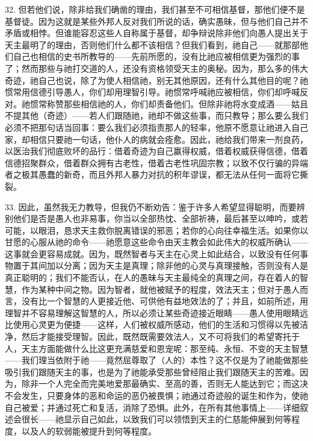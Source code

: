 32. 但若他们说，除非给我们确凿的理由，我们甚至不可相信基督，那他们便不是基督徒。因为这就是某些外邦人反对我们所说的话，确实愚昧，但与他们自己并不矛盾或相悖。但谁能容忍这些人自称属于基督，却争辩说除非他们向愚人提出关于天主最明了的理由，否则他们什么都不该相信？但我们看到，祂自己——就那部他们自己也相信的史书所教导的——先前所愿的，没有比祂应被相信更为强烈的事了；然而那些与祂打交道的人，还没有资格领受天主的奥秘。因为，那么多的伟大奇迹，祂自己也说，除了为使人相信祂，别无其他原因，还有什么其他目的呢？祂惯常用信德引导愚人，你们却用理智引导。祂惯常呼喊祂应被相信，你们却呼喊反对。祂惯常称赞那些相信祂的人，你们却责备他们。但除非祂将水变成酒——姑且不提其他（奇迹）——若人们跟随祂，祂却不做这些事，而只教导；那么要么我们必须不把那句话当回事：要么我们必须指责那人的轻率，他原不愿意让祂进入自己家，却相信只要祂一句话，他仆人的病就会痊愈。因此，祂给我们带来一剂良药，以医治我们彻底败坏的品行：借着奇迹为自己赢得权威，借着权威获得信德，借着信德招聚群众，借着群众拥有古老性，借着古老性巩固宗教；以致不仅行骗的异端者之极其愚蠢的新奇，而且外邦人暴力对抗的积年谬误，都无法从任何一面将它撕裂。\par

33. 因此，虽然我无力教导，但我仍不断劝告：鉴于许多人希望显得聪明，而要辨别他们是否是愚人也非易事，你当以全部热忱、全部祈祷，最后甚至以呻吟，或若可能，以眼泪，恳求天主救你脱离错误的邪恶；若你的心向往幸福生活。如果你以甘愿的心服从祂的命令——祂愿意这些命令由天主教会如此伟大的权威所确认——这事就会更容易成就。因为，既然智者与天主在心灵上如此结合，以致没有任何事物置于其间加以分离；因为天主是真理；除非他的心灵与真理接触，否则没有人是真正聪明的；我们不能否认，在人的愚昧与天主最纯全的真理之间，存在着人的智慧，作为某种中间之物。因为智者，就他被赋予的程度，效法天主；但对于愚人而言，没有比一个智慧的人更接近他、可供他有益地效法的了；并且，如前所述，用理智并不容易理解这智慧的人，所以必须让某些奇迹接近眼睛——愚人使用眼睛远比使用心灵更为便捷——这样，人们被权威所感动，他们的生活和习惯得以先被洁净，然后才能接受理智。因此，既然既需要效法人，又不可将我们的希望寄托于人，天主方面能做什么比这更充满慈爱和恩宠呢：那至纯、永恒、不变的天主智慧——我们理当依附于祂——竟然屈尊取了（人的）本性？这不仅是为了祂能做那些吸引我们跟随天主的事，也是为了祂能承受那些曾经阻止我们跟随天主的苦难。因为，除非一个人完全而完美地爱那最确实、至高的善，否则无人能达到它；而这决不会发生，只要身体的恶和命运的恶仍被畏惧；祂通过奇迹般的诞生和作为，使祂自己被爱；并通过死亡和复活，消除了恐惧。此外，在所有其他事情上——详细叙述会很长——祂显示自己如此，以致我们可以领悟到天主的仁慈能伸展到何等程度，以及人的软弱能被提升到何等程度。\par

